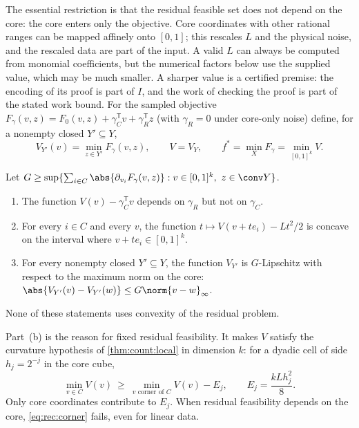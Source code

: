 The essential restriction is that the residual feasible set does not depend
on the core: the core enters only the objective. Core coordinates with other
rational ranges can be mapped affinely onto $[0,1]$; this rescales $L$ and
the physical noise, and the rescaled data are part of the input. A valid $L$
can always be computed from monomial coefficients, but the numerical factors
below use the supplied value, which may be much smaller. A sharper value is
a certified premise: the encoding of its proof is part of $I$, and the work
of checking the proof is part of the stated work bound. For the sampled
objective $F_\gamma(v,z)=F_0(v,z)+\gamma_C^{\mathsf T}v+\gamma_R^{\mathsf T}z$
(with $\gamma_R=0$ under core-only noise) define, for a nonempty closed
$Y'\subseteq Y$,
\begin{equation}\label{eq:rec:V}
 V_{Y'}(v)=\min_{z\in Y'}F_\gamma(v,z),\qquad V=V_Y,\qquad
 f^*=\min_XF_\gamma=\min_{[0,1]^k}V.
\end{equation}

\begin{lemma}\label{lem:rec:value}
Let $G\ge\sup\{\sum_{i\in C}\abs{\partial_{v_i}F_\gamma(v,z)}:
v\in[0,1]^k,\ z\in\conv Y\}$.
\begin{enumerate}[label=(\alph*)]
\item The function $V(v)-\gamma_C^{\mathsf T}v$ depends on $\gamma_R$ but not
on $\gamma_C$.
\item For every $i\in C$ and every $v$, the function
$t\mapsto V(v+te_i)-Lt^2/2$ is concave on the interval where
$v+te_i\in[0,1]^k$.
\item For every nonempty closed $Y'\subseteq Y$, the function $V_{Y'}$ is
$G$-Lipschitz with respect to the maximum norm on the core:
$\abs{V_{Y'}(v)-V_{Y'}(w)}\le G\norm{v-w}_\infty$.
\end{enumerate}
None of these statements uses convexity of the residual problem.
\end{lemma}

Part~(b) is the reason for fixed residual feasibility. It makes $V$ satisfy
the curvature hypothesis of \cref{thm:count:local} in dimension $k$: for a
dyadic cell of side $h_j=2^{-j}$ in the core cube,
\begin{equation}\label{eq:rec:corner}
 \min_{v\in C}V(v)\ \ge\ \min_{v\text{ corner of }C}V(v)-E_j,
 \qquad E_j=\frac{kLh_j^2}8 .
\end{equation}
Only core coordinates contribute to $E_j$. When residual feasibility depends
on the core, \eqref{eq:rec:corner} fails, even for linear data.

